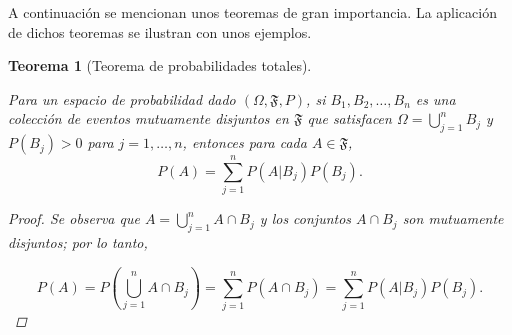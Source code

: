 \documentclass[
  us-letterpaper,
]{scrreprt}
\theoremstyle{plain}
\theoremstyle{definition}
\theoremstyle{definition}
\theoremstyle{plain}
\newtheorem{theorem}{Teorema}[chapter]
\theoremstyle{remark}
\begin{document}
A continuación se mencionan unos teoremas de gran importancia. La
aplicación de dichos teoremas se ilustran con unos ejemplos.

\begin{theorem}[Teorema de probabilidades
totales]\protect\hypertarget{thm-ptotales}{}\label{thm-ptotales}

Para un espacio de probabilidad dado \((\Omega, \mathfrak{F}, P)\), si
\(B_1, B_2, \ldots, B_n\) es una colección de eventos mutuamente
disjuntos en \(\mathfrak{F}\) que satisfacen
\(\Omega = \bigcup\limits_{j=1}^n B_j\) y \(P(B_j)>0\) para
\(j=1,\ldots, n\), entonces para cada \(A\in \mathfrak{F}\),
\[P(A)=\sum_{j=1}^n P(A|B_j)P(B_j).\]

\begin{proof}
Se observa que \(A=\bigcup\limits_{j=1}^n A\cap B_j\) y los conjuntos
\(A\cap B_j\) son mutuamente disjuntos; por lo tanto,

\[P(A)=P\left(\bigcup_{j=1}^n A\cap B_j\right)=\sum_{j=1}^n P(A\cap B_j)= \sum_{j=1}^n P(A|B_j)P(B_j).\]
\end{proof}

\end{theorem}
\end{document}
